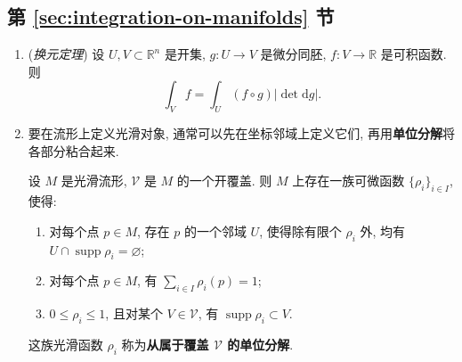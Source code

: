 \subsection{第 \ref{sec:integration-on-manifolds} 节}\label{subsec:notes-integration-on-manifolds}
\begin{enumerate}[label=(\arabic*),leftmargin=*]
\item (\emph{换元定理}) 设 $U,V\subset\mathbb{R}^n$ 是开集, $g:U\to V$ 是微分同胚, $f:V\to\mathbb{R}$ 是可积函数. 则
\[
  \int_V f=\int_U(f\circ g)|\det\mathrm{d}g|.
\]
\item 要在流形上定义光滑对象, 通常可以先在坐标邻域上定义它们, 再用\textbf{单位分解}将各部分粘合起来.

{%
\setcounter{RiemannDefinition}{0}%
\renewcommand{\theHRiemannDefinition}{\theHsubsection.\arabic{RiemannDefinition}}%
\begin{RiemannTheorem}\label{thm:existence-of-partitions-of-unity}
设 $M$ 是光滑流形, $\mathcal{V}$ 是 $M$ 的一个开覆盖. 则 $M$ 上存在一族可微函数 $\{\rho_i\}_{i\in I}$, 使得:
\begin{enumerate}[label=(\roman*),leftmargin=*]
\item 对每个点 $p\in M$, 存在 $p$ 的一个邻域 $U$, 使得除有限个 $\rho_i$ 外, 均有 $U\cap\operatorname{supp}\rho_i=\varnothing$;
\item 对每个点 $p\in M$, 有 $\sum_{i\in I}\rho_i(p)=1$;
\item $0\leq\rho_i\leq1$, 且对某个 $V\in\mathcal{V}$, 有 $\operatorname{supp}\rho_i\subset V$.
\end{enumerate}
\end{RiemannTheorem}

\begin{RiemannRemark}\label{rem:partition-of-unity-subordinate-to-cover}
这族光滑函数 $\rho_i$ 称为\textbf{从属于覆盖 $\mathcal{V}$ 的单位分解}.
\end{RiemannRemark}

}
\end{enumerate}
